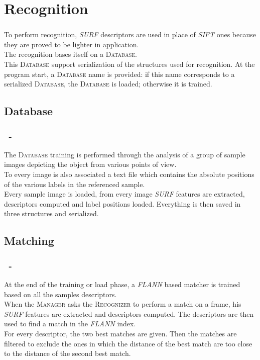 \documentclass{beamer}
\begin{document}
	\section{Recognition}

	\begin{frame}
		\frametitle{\insertsection}
		To perform recognition, \emph{SURF} descriptors are used in place of
		\emph{SIFT} ones because they are proved to be lighter in application.\\
		The recognition bases itself on a \textsc{Database}.\\
		This \textsc{Database} support serialization of the structures used for
		recognition. At the program start, a \textsc{Database} name is provided:
		if this name corresponds to a serialized \textsc{Database}, the
		\textsc{Database} is loaded; otherwise it is trained.\\
	\end{frame}

	\subsection{Database}

	\begin{frame}
		\frametitle{\insertsection\ - \insertsubsection}
		The \textsc{Database} training is performed through the analysis of a group
		of sample images depicting the object from various points of view.\\
		To every image is also associated a text file which contains the absolute
		positions of the various labels in the referenced sample.\\
		Every sample image is loaded, from every image \emph{SURF} features are
		extracted, descriptors computed and label positions loaded. Everything
		is then saved in three structures and serialized.\\
	\end{frame}

	\subsection{Matching}

	\begin{frame}
		\frametitle{\insertsection\ - \insertsubsection}
		At the end of the training or load phase, a \emph{FLANN} based matcher is
		trained based on all the samples descriptors.\\
		When the \textsc{Manager} asks the \textsc{Recognizer} to perform a match
		on a frame, his \emph{SURF} features are extracted and descriptors
		computed. The descriptors are then used to find a match in the
		\emph{FLANN} index.\\
		For every descriptor, the two best matches are given. Then the matches are
		filtered to exclude the ones in which the distance of the best match are
		too close to the distance of the second best match.\\
	\end{frame}
\end{document}
